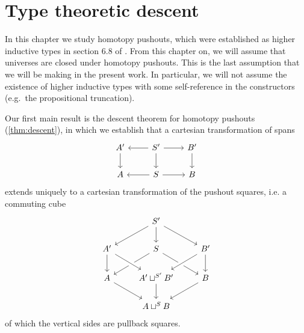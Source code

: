 \chapter{Type theoretic descent}

In this chapter we study homotopy pushouts, which were established as higher inductive types in section 6.8 of \cite{hottbook}. From this chapter on, we will assume that universes are closed under homotopy pushouts. This is the last assumption that we will be making in the present work. In particular, we will not assume the existence of higher inductive types with some self-reference in the constructors (e.g.~the propositional truncation).

Our first main result is the descent theorem for homotopy pushouts (\cref{thm:descent}), in which we establish that a cartesian transformation of spans
\begin{equation*}
\begin{tikzcd}
A' \arrow[d]  & S' \arrow[l] \arrow[r] \arrow[d] & B' \arrow[d] \\
A & S \arrow[l] \arrow[r] & B
\end{tikzcd}
\end{equation*}
extends uniquely to a cartesian transformation of the pushout squares, i.e. a commuting cube
\begin{equation*}
\begin{tikzcd}
& S' \arrow[dl] \arrow[dr] \arrow[d] \\
A' \arrow[d] & S \arrow[dl] \arrow[dr] & B' \arrow[dl,crossing over] \arrow[d] \\
A \arrow[dr] & A'\sqcup^{S'}B' \arrow[d] \arrow[from=ul,crossing over] & B \arrow[dl] \\
& A\sqcup^S B
\end{tikzcd}
\end{equation*}
of which the vertical sides are pullback squares. 

